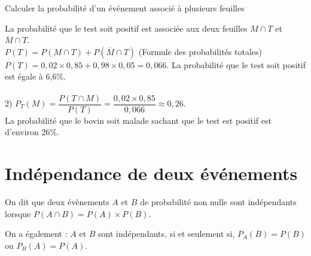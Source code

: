 \begin{methodeTitre}{Calculer la probabilité d'un événement associé à plusieurs feuilles}
\begin{center}
	\end{center}	
	La probabilité que le test soit positif est associée aux deux feuilles $M\cap T$ et $\overline M\cap T$.\\
	$P(T)=P(M\cap T)+P(\overline M\cap T )$ (Formule des probabilités totales)\\
	$P(T)= 0,02 \times 0,85 + 0,98 \times 0,05 = 0,066$.
	La probabilité que le test soit positif est égale à 6,6\%. \\
	\ \\
	2) $P_T (M)= \dfrac{P(T\cap M)}{P(T)}  = \dfrac{0,02\times 0,85}{0,066} \approx 0,26$.\\
	La probabilité que le bovin soit malade sachant que le test est positif est d'environ 26\%.
\end{methodeTitre}

\section{Indépendance de deux événements}


\begin{definition}
	On dit que deux évènements $A$ et $B$ de probabilité non nulle sont indépendants lorsque $P(A\cap B)=P(A)\times P(B)$.
\end{definition}

\begin{remarque}
	On a également :
	$A$ et $B$ sont indépendants, si et seulement si, $P_A (B)=P(B)$ ou $P_B (A)=P(A)$.
\end{remarque}


